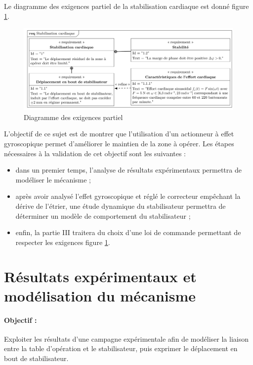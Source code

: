 Le diagramme des exigences partiel de la stabilisation cardiaque est donné figure \ref{fig03}.
 
\begin{figure}[ht]
\begin{center}
\includegraphics[width=0.95\linewidth]{img/fig03}
\caption{Diagramme des exigences partiel}
\label{fig03}
\end{center}
\end{figure} 

L'objectif de ce sujet est de montrer que l'utilisation d'un actionneur à effet gyroscopique permet d'améliorer le maintien de la zone à opérer. Les étapes nécessaires à la validation de cet objectif sont les suivantes : 
\begin{itemize}
 \item dans un premier temps, l'analyse de résultats expérimentaux permettra de modéliser le mécanisme ; 
 \item après avoir analysé l'effet gyroscopique et réglé le correcteur empêchant la dérive de l'étrier, une étude dynamique du stabilisateur permettra de déterminer un modèle de comportement du stabilisateur ; 
 \item enfin, la partie III traitera du choix d'une loi de commande permettant de respecter les exigences figure \ref{fig03}. 
\end{itemize}

\newpage

\section{Résultats expérimentaux et modélisation du mécanisme\label{partI}}

\paragraph{Objectif :} Exploiter les résultats d'une campagne expérimentale afin de modéliser la liaison entre la table d'opé­ration et le stabilisateur, puis exprimer le déplacement en bout de stabilisateur.

